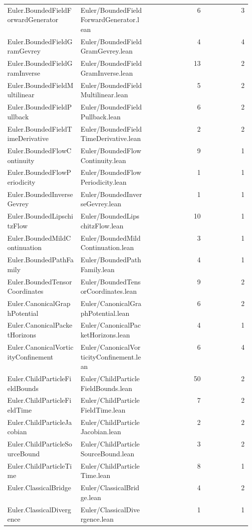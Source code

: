 \begin{longtable}{p{0.30\linewidth}p{0.28\linewidth}rr}
Euler.BoundedFieldForwardGenerator & Euler/BoundedFieldForwardGenerator.lean & 6 & 3\\
Euler.BoundedFieldGramGevrey & Euler/BoundedFieldGramGevrey.lean & 4 & 4\\
Euler.BoundedFieldGramInverse & Euler/BoundedFieldGramInverse.lean & 13 & 2\\
Euler.BoundedFieldMultilinear & Euler/BoundedFieldMultilinear.lean & 5 & 2\\
Euler.BoundedFieldPullback & Euler/BoundedFieldPullback.lean & 6 & 2\\
Euler.BoundedFieldTimeDerivative & Euler/BoundedFieldTimeDerivative.lean & 2 & 2\\
Euler.BoundedFlowContinuity & Euler/BoundedFlowContinuity.lean & 9 & 1\\
Euler.BoundedFlowPeriodicity & Euler/BoundedFlowPeriodicity.lean & 1 & 1\\
Euler.BoundedInverseGevrey & Euler/BoundedInverseGevrey.lean & 1 & 1\\
Euler.BoundedLipschitzFlow & Euler/BoundedLipschitzFlow.lean & 10 & 1\\
Euler.BoundedMildContinuation & Euler/BoundedMildContinuation.lean & 3 & 1\\
Euler.BoundedPathFamily & Euler/BoundedPathFamily.lean & 4 & 1\\
Euler.BoundedTensorCoordinates & Euler/BoundedTensorCoordinates.lean & 9 & 2\\
Euler.CanonicalGraphPotential & Euler/CanonicalGraphPotential.lean & 6 & 2\\
Euler.CanonicalPacketHorizons & Euler/CanonicalPacketHorizons.lean & 4 & 1\\
Euler.CanonicalVorticityConfinement & Euler/CanonicalVorticityConfinement.lean & 6 & 4\\
Euler.ChildParticleFieldBounds & Euler/ChildParticleFieldBounds.lean & 50 & 2\\
Euler.ChildParticleFieldTime & Euler/ChildParticleFieldTime.lean & 7 & 2\\
Euler.ChildParticleJacobian & Euler/ChildParticleJacobian.lean & 2 & 2\\
Euler.ChildParticleSourceBound & Euler/ChildParticleSourceBound.lean & 3 & 2\\
Euler.ChildParticleTime & Euler/ChildParticleTime.lean & 8 & 1\\
Euler.ClassicalBridge & Euler/ClassicalBridge.lean & 4 & 2\\
Euler.ClassicalDivergence & Euler/ClassicalDivergence.lean & 1 & 1\\

\end{longtable}
